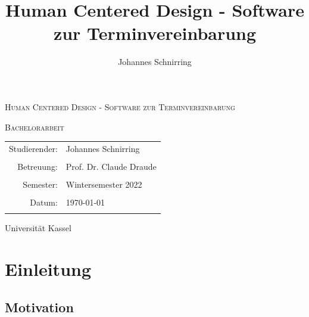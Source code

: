 \documentclass[12pt]{article}
\title{Human Centered Design - Software zur Terminvereinbarung}
\author{Johannes Schnirring}
\begin{document}
\begin{titlepage}
    \centering
    {\scshape\LARGE Human Centered Design - Software zur Terminvereinbarung \par}
    \vspace{1cm}

    {\scshape\Large Bachelorarbeit\par}
    \vspace{1.5cm}

    \begin{tabular}{r l}
        {\Large Studierender:} & {\Large Johannes Schnirring}             \\ \\
        {\Large Betreuung:}    & {\Large Prof. Dr. Claude Draude        } \\ \\
        {\Large Semester:}     & {\Large Wintersemester 2022}             \\ \\
        {\Large Datum:}        & {\Large \today}                          \\ \\
    \end{tabular}
    \vfill
    {\large Universität Kassel}


\end{titlepage}

\tableofcontents
\newpage

\section{Einleitung}

\subsection{Motivation}

\end{document}
